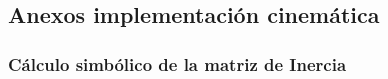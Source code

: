 \subsection{Anexos implementación cinemática}
    \subsubsection{Cálculo simbólico de la matriz de Inercia} \label{cd:inercia}
    